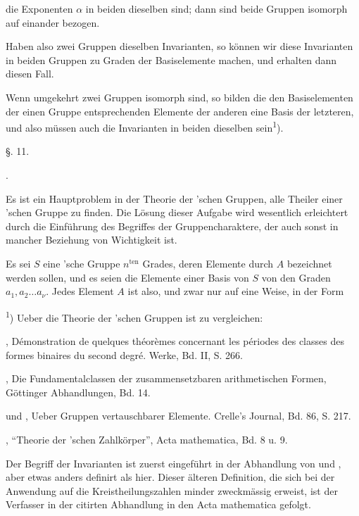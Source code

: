 
die Exponenten $\alpha$ in beiden dieselben sind; dann sind beide
Gruppen isomorph auf einander bezogen.

Haben also zwei Gruppen dieselben Invarianten, so können
wir diese Invarianten in beiden Gruppen zu Graden der Basiselemente
 machen, und erhalten dann diesen Fall.

Wenn umgekehrt zwei Gruppen isomorph sind, so bilden
die den Basiselementen der einen Gruppe entsprechenden Elemente
 der anderen eine Basis der letzteren, und also müssen
auch die Invarianten in beiden dieselben sein\textsuperscript{1}).

\begin{center}
§. 11.

.
\end{center}

Es ist ein Hauptproblem in der Theorie der 'schen
Gruppen, alle Theiler einer 'schen Gruppe zu finden. Die
Lösung dieser Aufgabe wird wesentlich erleichtert durch die
Einführung des Begriffes der Gruppencharaktere, der auch sonst
in mancher Beziehung von Wichtigkeit ist.

Es sei $S$ eine 'sche Gruppe $n^{\text{ten}}$ Grades, deren Elemente
 durch $A$ bezeichnet werden sollen, und es seien
die Elemente einer Basis von $S$ von den Graden $a_1, a_2 \ldots a_\nu$.
Jedes Element $A$ ist also, und zwar nur auf eine Weise, in
der Form

\textsuperscript{1}) Ueber die Theorie der 'schen Gruppen ist zu vergleichen:

, D\'emonstration de quelques th\'eor\`emes concernant les
périodes des classes des formes binaires du second degré. Werke,
Bd. II, S. 266.

, Die Fundamentalclassen der zusammensetzbaren
arithmetischen Formen, Göttinger Abhandlungen, Bd. 14.

 und , Ueber Gruppen vertauschbarer
 Elemente. Crelle's Journal, Bd. 86, S. 217.

, ``Theorie der 'schen Zahlkörper'', Acta mathematica,
Bd. 8 u. 9.

Der Begriff der Invarianten ist zuerst eingeführt in der Abhandlung
von  und , aber etwas anders definirt als
hier. Dieser älteren Definition, die sich bei der Anwendung auf die Kreistheilungszahlen
 minder zweckmässig erweist, ist der Verfasser in der
citirten Abhandlung in den Acta mathematica gefolgt.
